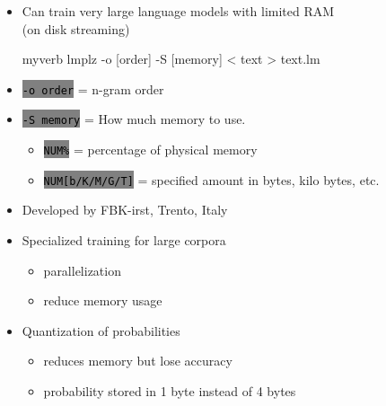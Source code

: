 \documentclass[landscape]{uedslides2C}
\newcommand{\littlecode}[1]{\colorbox{gray}{\textcolor{black}{\small \tt #1}}}
\begin{document}
\vspace{5mm}
\begin{itemize}
\item Can train very large language models with limited RAM\\
(on disk streaming)\\[5mm]
\begin{SaveVerbatim}{myverb} 
lmplz -o [order] -S [memory] < text > text.lm
\end{SaveVerbatim}
\colorbox{gray}{}

\item \littlecode{-o order} = n-gram order
\item \littlecode{-S memory} = How much memory to use.
	      \begin{itemize}
		\item \littlecode{NUM\%} = percentage of physical memory \vspace{2mm}
		\item \littlecode{NUM[b/K/M/G/T]} = specified amount in bytes, kilo bytes, etc.
	      \end{itemize}
\end{itemize}

\vspace{10mm}
\begin{itemize}

\item Developed by FBK-irst, Trento, Italy

\item Specialized training for large corpora
	\begin{itemize}
	\item parallelization
	\item reduce memory usage
	\end{itemize}

\item Quantization of probabilities
	\begin{itemize}
	\item reduces memory but lose accuracy
	\item probability stored in 1 byte instead of 4 bytes
	\end{itemize}
\end{itemize}
\end{document}

